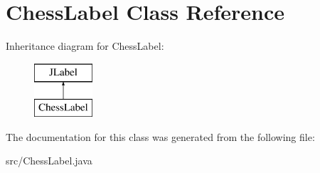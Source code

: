 \hypertarget{class_chess_label}{}\section{Chess\+Label Class Reference}
\label{class_chess_label}
Inheritance diagram for Chess\+Label\+:\begin{figure}[H]
\begin{center}
\leavevmode
\includegraphics[height=2.000000cm]{class_chess_label}
\end{center}
\end{figure}


The documentation for this class was generated from the following file\+:\begin{DoxyCompactItemize}
\item 
src/Chess\+Label.\+java\end{DoxyCompactItemize}
